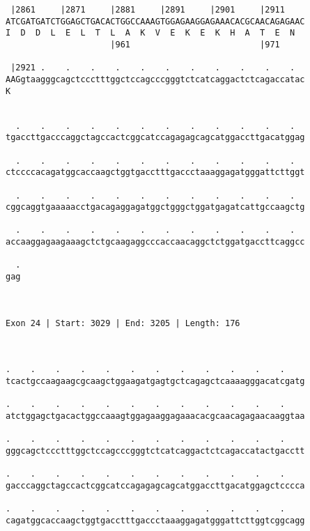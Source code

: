 \documentclass{article}
\begin{document}
\begin{Verbatim}
 |2861     |2871     |2881     |2891     |2901     |2911    
ATCGATGATCTGGAGCTGACACTGGCCAAAGTGGAGAAGGAGAAACACGCAACAGAGAAC
I  D  D  L  E  L  T  L  A  K  V  E  K  E  K  H  A  T  E  N  
                     |961                          |971     
  
 |2921 .    .    .    .    .    .    .    .    .    .    .  
AAGgtaagggcagctccctttggctccagcccgggtctcatcaggactctcagaccatac
K                                                           
                                                            
  
  .    .    .    .    .    .    .    .    .    .    .    .  
tgaccttgacccaggctagccactcggcatccagagagcagcatggaccttgacatggag
                                                            
  .    .    .    .    .    .    .    .    .    .    .    .  
ctccccacagatggcaccaagctggtgacctttgaccctaaaggagatgggattcttggt
                                                            
  .    .    .    .    .    .    .    .    .    .    .    .  
cggcaggtgaaaaacctgacagaggagatggctgggctggatgagatcattgccaagctg
                                                            
  .    .    .    .    .    .    .    .    .    .    .    .  
accaaggagaagaaagctctgcaagaggcccaccaacaggctctggatgaccttcaggcc
                                                            
  .
gag
   
   
 
Exon 24 | Start: 3029 | End: 3205 | Length: 176



.    .    .    .    .    .    .    .    .    .    .    .    
tcactgccaagaagcgcaagctggaagatgagtgctcagagctcaaaagggacatcgatg
                                                            
.    .    .    .    .    .    .    .    .    .    .    .    
atctggagctgacactggccaaagtggagaaggagaaacacgcaacagagaacaaggtaa
                                                            
.    .    .    .    .    .    .    .    .    .    .    .    
gggcagctccctttggctccagcccgggtctcatcaggactctcagaccatactgacctt
                                                            
.    .    .    .    .    .    .    .    .    .    .    .    
gacccaggctagccactcggcatccagagagcagcatggaccttgacatggagctcccca
                                                            
.    .    .    .    .    .    .    .    .    .    .    .    
cagatggcaccaagctggtgacctttgaccctaaaggagatgggattcttggtcggcagg
                                                            

\end{Verbatim}
\end{document}
